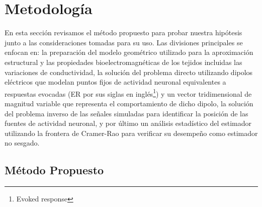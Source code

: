 %
\chapter{Metodología}
\label{sec:methodology}



En esta sección revisamos el método propuesto para probar nuestra hipótesis junto a las consideraciones tomadas para su uso. Las divisiones principales se enfocan en: la preparación del modelo geométrico utilizado para la aproximación estructural y las propiedades bioelectromagnéticas de los tejidos incluidas las variaciones de conductividad, la solución del problema directo utilizando dipolos eléctricos que modelan puntos fijos de actividad neuronal equivalentes a respuestas evocadas (ER por sus siglas en inglés\footnote{Evoked response}) y un vector tridimensional de magnitud variable que representa el comportamiento de dicho dipolo, la solución del problema inverso de las señales simuladas para identificar la posición de las fuentes de actividad neuronal, y por último un análisis estadístico del estimador utilizando la frontera de Cramer-Rao para verificar su desempeño como estimador no sesgado.

\section{Método Propuesto}
\label{sec:methodology:method}


